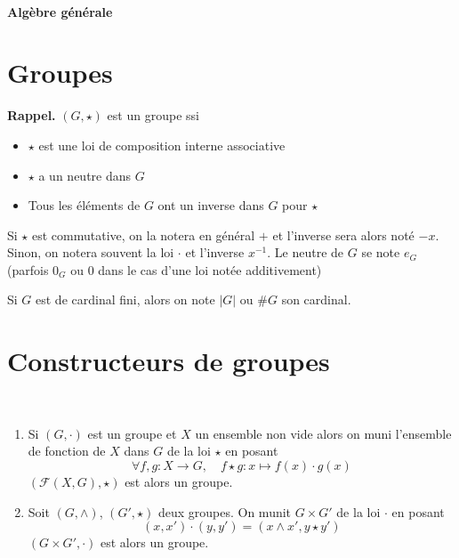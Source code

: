
\ifsolo
    ~

    \vspace{1cm}

    \begin{center}
        \textbf{\LARGE Algèbre générale} \\[1em]
    \end{center}
    \tableofcontents
\else
    \minitoc
\fi
\thispagestyle{empty}

\ifsolo \newpage \setcounter{page}{1} \fi
\section{Groupes}

\textbf{Rappel.} $(G, \star)$ est un groupe ssi \begin{itemize}
    \item $\star$ est une loi de composition interne associative
    \item $\star$ a un neutre dans $G$
    \item Tous les éléments de $G$ ont un inverse dans $G$ pour $\star$
\end{itemize}

\begin{notation}
    Si $\star$ est commutative, on la notera en général $+$ et l'inverse sera alors noté $-x$. Sinon, on notera souvent la loi $\cdot$ et l'inverse $x^{-1}$. Le neutre de $G$ se note $e_G$ (parfois $0_G$ ou $0$ dans le cas d'une loi notée additivement)
\end{notation}

Si $G$ est de cardinal fini, alors on note $|G|$ ou $\#G$ son cardinal.

\section{Constructeurs de groupes}

\begin{prop}~
    \begin{enumerate}
        \item Si $(G, \cdot)$ est un groupe et $X$ un ensemble non vide alors on muni l'ensemble de fonction de $X$ dans $G$ de la loi $\star$ en posant \[
                \forall f, g: X\longrightarrow G, \quad f\star g:x\longmapsto f(x)\cdot g(x)
            \]
            $(\mathcal F(X, G), \star)$ est alors un groupe.
        \item Soit $(G, \land)$, $(G', \star)$ deux groupes. On munit $G\times G'$ de la loi $\cdot$ en posant \[
                (x, x')\cdot (y, y')=(x\land x', y\star y')
            \]
            $(G\times G', \cdot)$ est alors un groupe.
    \end{enumerate}
\end{prop}


